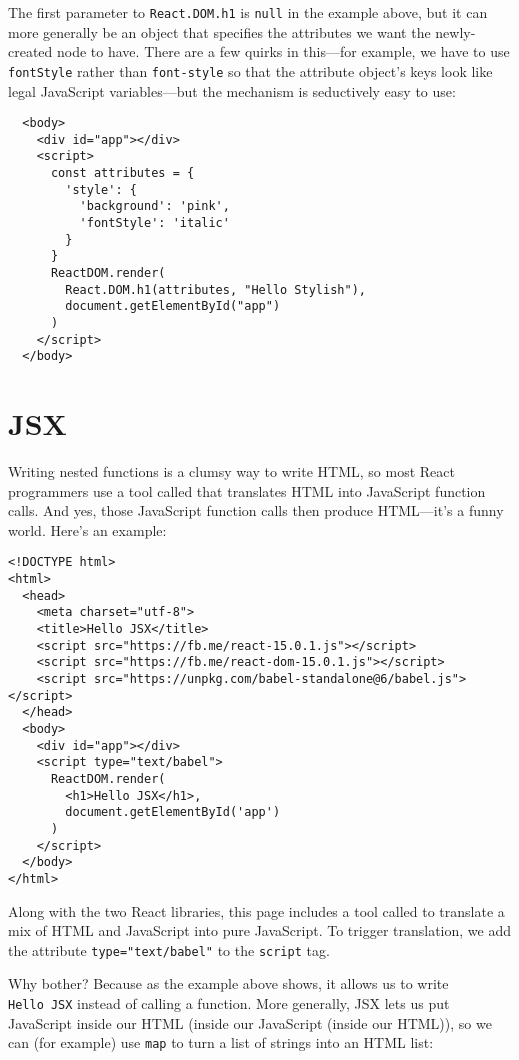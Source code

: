 The first parameter to \texttt{React.DOM.h1} is \texttt{null} in the example above,
but it can more generally be an object that specifies
the attributes we want the newly-created node to have.
There are a few quirks in this---for example,
we have to use \texttt{fontStyle} rather than \texttt{font-style}
so that the attribute object's keys look like legal JavaScript variables---but
the mechanism is seductively easy to use:

\begin{verbatim}
  <body>
    <div id="app"></div>
    <script>
      const attributes = {
        'style': {
          'background': 'pink',
          'fontStyle': 'italic'
        }
      }
      ReactDOM.render(
        React.DOM.h1(attributes, "Hello Stylish"),
        document.getElementById("app")
      )
    </script>
  </body>
\end{verbatim}

\section{JSX}\label{s:dynamic-jsx}

Writing nested functions is a clumsy way to write HTML,
so most React programmers use a tool called 
that translates HTML into JavaScript function calls.
And yes,
those JavaScript function calls then produce HTML---it's a funny world.
Here's an example:

\begin{verbatim}
<!DOCTYPE html>
<html>
  <head>
    <meta charset="utf-8">
    <title>Hello JSX</title>
    <script src="https://fb.me/react-15.0.1.js"></script>
    <script src="https://fb.me/react-dom-15.0.1.js"></script>
    <script src="https://unpkg.com/babel-standalone@6/babel.js"></script>
  </head>
  <body>
    <div id="app"></div>
    <script type="text/babel">
      ReactDOM.render(
        <h1>Hello JSX</h1>,
        document.getElementById('app')
      )
    </script>
  </body>
</html>
\end{verbatim}

Along with the two React libraries,
this page includes a tool called 
to translate a mix of HTML and JavaScript into pure JavaScript.
To trigger translation,
we add the attribute \texttt{type="text/babel"} to the \texttt{script} tag.

Why bother?
Because as the example above shows,
it allows us to write \texttt{Hello\ JSX} instead of calling a function.
More generally,
JSX lets us put JavaScript inside our HTML (inside our JavaScript (inside our HTML)),
so we can (for example) use \texttt{map} to turn a list of strings into an HTML list:

